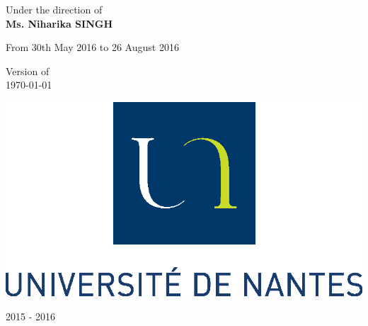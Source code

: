 \begin{titlepage}
\begin{center}
\vfill 


\Large{Under the direction of} \\
\Large{\textbf{Ms. Niharika SINGH}} 

\vfill





\Large{From 30th May 2016 to 26 August 2016}

\vfill

\large{Version of} \\
\large{\today} 

\vfill

\includegraphics[scale=0.6]{images/logo_ecoles/Universite_de_Nantes_} 

\vfill

\large{2015 - 2016} 





\end{center}

\end{titlepage}